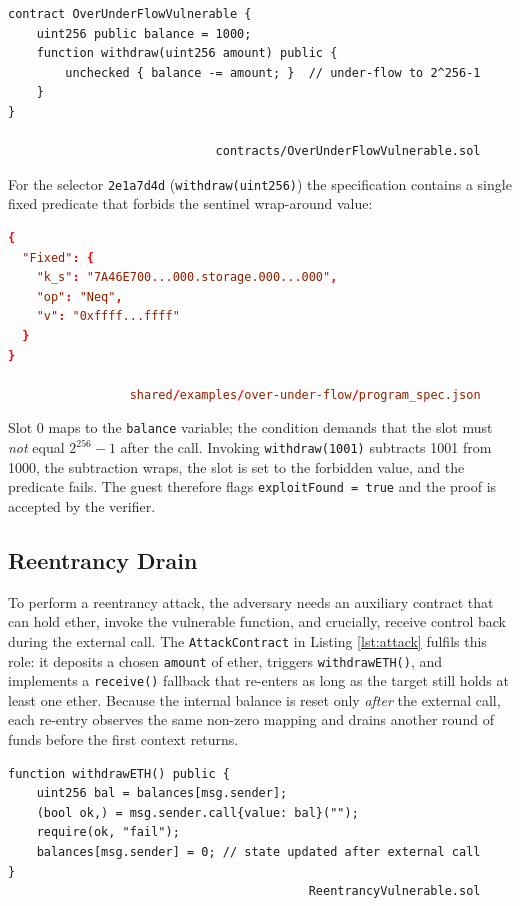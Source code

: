 \begin{lstlisting}[caption={[OverUnderFlowVulnerable.sol]},language=Solidity]
contract OverUnderFlowVulnerable {
    uint256 public balance = 1000;
    function withdraw(uint256 amount) public {
        unchecked { balance -= amount; }  // under-flow to 2^256-1
    }
}

                             contracts/OverUnderFlowVulnerable.sol    
\end{lstlisting}

For the selector \texttt{2e1a7d4d} (\texttt{withdraw(uint256)}) the specification contains a single fixed predicate that forbids the sentinel wrap-around value:

\begin{lstlisting}[caption={[Predicate for withdraw]},language=toml]
{
  "Fixed": {
    "k_s": "7A46E700...000.storage.000...000",
    "op": "Neq",
    "v": "0xffff...ffff"
  }
}

                 shared/examples/over-under-flow/program_spec.json
\end{lstlisting}

Slot 0 maps to the \texttt{balance} variable; the condition demands that the slot must \textit{not} equal \(2^{256}-1\) after the call.  Invoking \texttt{withdraw(1001)} subtracts 1001 from 1000, the subtraction wraps, the slot is set to the forbidden value, and the predicate fails.  The guest therefore flags \texttt{exploitFound = true} and the proof is accepted by the verifier.


\subsection{Reentrancy Drain}\label{reentrancyAttack}

To perform a reentrancy attack, the adversary needs an auxiliary contract that can hold ether, invoke the vulnerable function, and crucially, receive control back during the external call. The \texttt{AttackContract} in Listing \ref{lst:attack} fulfils this role: it deposits a chosen \texttt{amount} of ether, triggers \texttt{withdrawETH()}, and implements a \texttt{receive()} fallback that re-enters as long as the target still holds at least one ether.  Because the internal balance is reset only \textit{after} the external call, each re-entry observes the same non-zero mapping and drains another round of funds before the first context returns.

\begin{lstlisting}[caption={[ReentrancyVulnerable.sol]},language=Solidity]
function withdrawETH() public {
    uint256 bal = balances[msg.sender];
    (bool ok,) = msg.sender.call{value: bal}("");
    require(ok, "fail");
    balances[msg.sender] = 0; // state updated after external call
}
                                          ReentrancyVulnerable.sol
\end{lstlisting}

